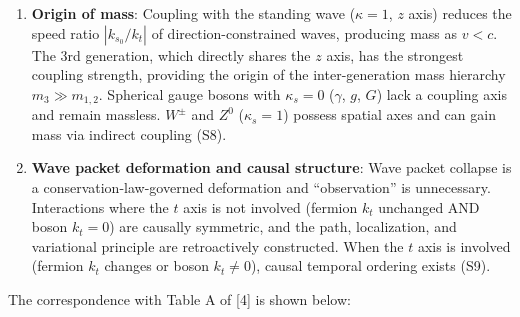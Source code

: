 \documentclass[
  a4paper,11pt]{article}
\theoremstyle{definition}
\theoremstyle{remark}
\begin{document}
\begin{enumerate}
  emission are systematically described (S7).
\item
  \textbf{Origin of mass}: Coupling with the standing wave
  (\(\kappa = 1\), \(z\) axis) reduces the speed ratio
  \(|k_{s_0} / k_t|\) of direction-constrained waves, producing mass as
  \(v < c\). The 3rd generation, which directly shares the \(z\) axis,
  has the strongest coupling strength, providing the origin of the
  inter-generation mass hierarchy \(m_3 \gg m_{1,2}\). Spherical gauge
  bosons with \(\kappa_s = 0\) (\(\gamma\), \(g\), \(G\)) lack a
  coupling axis and remain massless. \(W^{\pm}\) and \(Z^0\)
  (\(\kappa_s = 1\)) possess spatial axes and can gain mass via indirect
  coupling (S8).
\item
  \textbf{Wave packet deformation and causal structure}: Wave packet
  collapse is a conservation-law-governed deformation and
  ``observation'' is unnecessary. Interactions where the \(t\) axis is
  not involved (fermion \(k_t\) unchanged AND boson \(k_t = 0\)) are
  causally symmetric, and the path, localization, and variational
  principle are retroactively constructed. When the \(t\) axis is
  involved (fermion \(k_t\) changes or boson \(k_t \neq 0\)), causal
  temporal ordering exists (S9).
\end{enumerate}

The correspondence with Table A of {[}4{]} is shown below:
\end{document}
